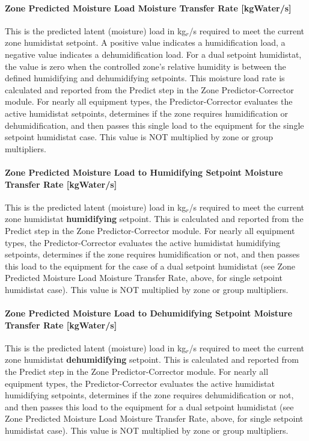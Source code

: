 \paragraph{Zone Predicted Moisture Load Moisture Transfer Rate {[}kgWater/s{]}}

This is the predicted latent (moisture) load in kg\(_{r}\)/s required to meet the current zone humidistat setpoint. A positive value indicates a humidification load, a negative value indicates a dehumidification load. For a dual setpoint humidistat, the value is zero when the controlled zone's relative humidity is between the defined humidifying and dehumidifying setpoints. This moisture load rate is calculated and reported from the Predict step in the Zone Predictor-Corrector module. For nearly all equipment types, the Predictor-Corrector evaluates the active humidistat setpoints, determines if the zone requires humidification or dehumidification, and then passes this single load to the equipment for the single setpoint humidistat case. This value is NOT multiplied by zone or group multipliers.

\paragraph{Zone Predicted Moisture Load to Humidifying Setpoint Moisture Transfer Rate {[}kgWater/s{]}}

This is the predicted latent (moisture) load in kg\(_{r}\)/s required to meet the current zone humidistat \textbf{humidifying} setpoint. This is calculated and reported from the Predict step in the Zone Predictor-Corrector module. For nearly all equipment types, the Predictor-Corrector evaluates the active humidistat humidifying setpoints, determines if the zone requires humidification or not, and then passes this load to the equipment for the case of a dual setpoint humidistat (see Zone Predicted Moisture Load Moisture Transfer Rate, above, for single setpoint humidistat case). This value is NOT multiplied by zone or group multipliers.

\paragraph{Zone Predicted Moisture Load to Dehumidifying Setpoint Moisture Transfer Rate {[}kgWater/s{]}}

This is the predicted latent (moisture) load in kg\(_{r}\)/s required to meet the current zone humidistat \textbf{dehumidifying} setpoint. This is calculated and reported from the Predict step in the Zone Predictor-Corrector module. For nearly all equipment types, the Predictor-Corrector evaluates the active humidistat humidifying setpoints, determines if the zone requires dehumidification or not, and then passes this load to the equipment for a dual setpoint humidistat (see Zone Predicted Moisture Load Moisture Transfer Rate, above, for single setpoint humidistat case). This value is NOT multiplied by zone or group multipliers.


